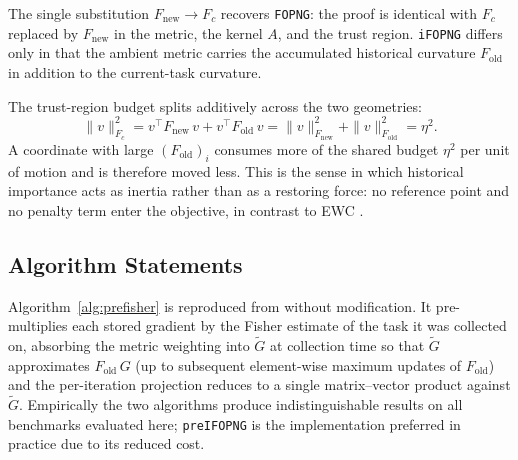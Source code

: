 \begin{remark}
The single substitution $F_{\mathrm{new}} \to F_c$ recovers \texttt{FOPNG}:
the proof is identical with $F_c$ replaced by $F_{\mathrm{new}}$ in the
metric, the kernel $A$, and the trust region.
\texttt{iFOPNG} differs only in that the ambient metric carries the
accumulated historical curvature $F_{\mathrm{old}}$ in addition to the
current-task curvature.
\end{remark}

\begin{remark}
The trust-region budget splits additively across the two geometries:
\begin{equation}
    \|v\|_{F_c}^2
    = v^\top F_{\mathrm{new}}\, v + v^\top F_{\mathrm{old}}\, v
    = \|v\|_{F_{\mathrm{new}}}^2 + \|v\|_{F_{\mathrm{old}}}^2 = \eta^2 .
\end{equation}
A coordinate with large $(F_{\mathrm{old}})_i$ consumes more of the shared
budget $\eta^2$ per unit of motion and is therefore moved less.
This is the sense in which historical importance acts as inertia rather than
as a restoring force: no reference point and no penalty term enter the
objective, in contrast to EWC \citep{kirkpatrick_overcoming_2017}.
\end{remark}

\subsection*{Algorithm Statements}

Algorithm~\ref{alg:prefisher} is reproduced from
\citet{garg_fisher-orthogonal_2026} without modification.
It pre-multiplies each stored gradient by the Fisher estimate of the task it
was collected on, absorbing the metric weighting into $\tilde{G}$ at
collection time so that $\tilde{G}$ approximates $F_{\mathrm{old}}\,G$ (up to
subsequent element-wise maximum updates of $F_{\mathrm{old}}$) and the
per-iteration projection reduces to a single matrix--vector product against
$\tilde{G}$.
Empirically the two algorithms produce indistinguishable results on all
benchmarks evaluated here; \texttt{preIFOPNG} is the implementation preferred
in practice due to its reduced cost.


